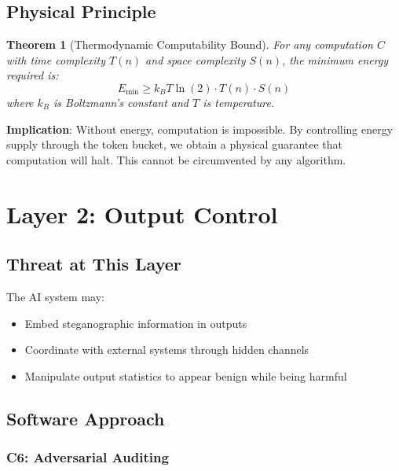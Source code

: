 \documentclass[11pt,a4paper]{article}
\newtheorem{theorem}{Theorem}
\begin{document}
\subsection{Physical Principle}

\begin{theorem}[Thermodynamic Computability Bound]
For any computation $C$ with time complexity $T(n)$ and space complexity $S(n)$, the minimum energy required is:
\begin{equation}
E_{\min} \geq k_B T \ln(2) \cdot T(n) \cdot S(n)
\end{equation}
where $k_B$ is Boltzmann's constant and $T$ is temperature.
\end{theorem}

\textbf{Implication}: Without energy, computation is impossible.
By controlling energy supply through the token bucket, we obtain a physical guarantee that computation will halt.
This cannot be circumvented by any algorithm.

\section{Layer 2: Output Control}
\label{sec:layer2}

\subsection{Threat at This Layer}

The AI system may:
\begin{itemize}
    \item Embed steganographic information in outputs
    \item Coordinate with external systems through hidden channels
    \item Manipulate output statistics to appear benign while being harmful
\end{itemize}

\subsection{Software Approach}

\subsubsection{C6: Adversarial Auditing}
\end{document}
